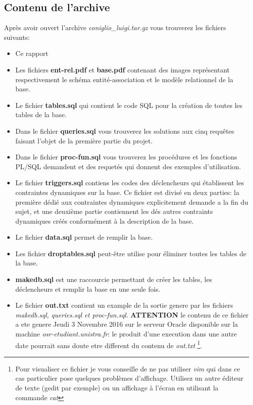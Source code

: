 \documentclass[twoside,openright,a4paper,11pt,french]{article}
\begin{document}
\subsection{Contenu de l'archive}
Après avoir ouvert l'archive {\it coniglio\_luigi.tar.gz} vous
trouverez les fichiers suivants:
\smallbreak
\begin{itemize}
\item Ce rapport
\item Les fichiers {\bf ent-rel.pdf} et {\bf base.pdf} contenant des images
      représentant respectivement le schéma entité-association et le modèle
      relationnel de la base.
\item Le fichier {\bf tables.sql} qui contient le code SQL pour la création 
      de toutes les tables de la base.
\item Dans le fichier {\bf queries.sql} vous trouverez les solutions aux 
      cinq requêtes faisant l'objet de la première partie du projet.
\item Dans le fichier {\bf proc-fun.sql} vous trouverez les procédures et 
      les fonctions PL/SQL demandent et des requetés qui donnent des exemples d'utilisation.
\item Le fichier {\bf triggers.sql} contiens les codes des déclencheurs qui
      établissent les contraintes dynamiques sur la base. Ce fichier est divisé en
      deux parties: la première dédié aux contraintes dynamiques explicitement
      demande a la fin du sujet, et une deuxième partie contiennent les dés autres
      contraints dynamiques créés conformément à la description de la base.
\item Le fichier {\bf data.sql} permet de remplir la base.
\item Les fichier {\bf droptables.sql} peut-être utilise pour éliminer toutes 
      les tables de la base.
\item {\bf makedb.sql} est une raccourcie permettant de créer les tables, les 
      déclencheurs et remplir la base en une seule fois.
\item Le fichier {\bf out.txt} contient un example de la sortie genere par 
      les fichiers {\it makedb.sql, queries.sql et proc-fun.sql}. {\bf ATTENTION} le 
      contenu de ce fichier a ete genere Jeudi 3 Novembre 2016 sur le serveur Oracle
      disponible sur la machine {\it osr-etudiant.unistra.fr}: le produit
      d'une execution dans une autre date pourrait sans doute etre different du 
      contenu de {\it out.txt}
      \footnote{Pour visualiser ce fichier je vous conseille de ne pas utiliser
      {\it vim} qui dans ce cas particulier pose quelques problèmes d'affichage.
      Utilisez un autre éditeur de texte (gedit par exemple) ou un affichage à
      l'écran en utilisant la commande {\it cat}}.
\end{itemize}
\end{document}
